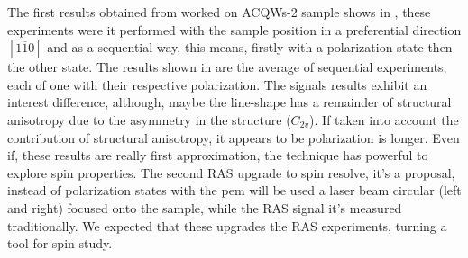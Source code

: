 The first results obtained from worked on ACQWs-2 sample shows in , these experiments were it performed with the sample position in a preferential direction $[1\overline{1}0]$ and as a sequential way, this means, firstly with a polarization state then the other state. The results shown in  are the average of sequential experiments, each of one with their respective polarization. The signals results exhibit an interest difference, although, maybe the  line-shape has a remainder of structural anisotropy due to the asymmetry in the structure ($C_{2v}$).  If taken into account the contribution of structural anisotropy, it appears to be polarization is  longer. Even if, these results are really first approximation, the technique has powerful to explore spin properties. 
The second \gls{RAS} upgrade to  spin resolve, it's a proposal, instead of polarization states  with the \gls{pem} will be used a laser beam circular (left and right)  focused onto the sample, while the \gls{RAS} signal it's measured traditionally. 
We expected that these upgrades the RAS experiments, turning a  tool for spin study. 









